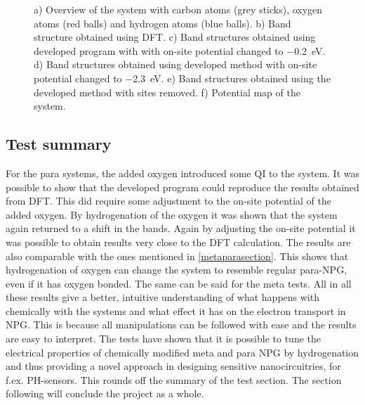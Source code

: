 \begin{figure}[H]
\begin{subfigure}[b]{0.8\textwidth}
		\vspace{-1\baselineskip}
		\caption{}
		\label{potmapMS2OH}
	\end{subfigure}
	\caption{a) Overview of the system with carbon atoms (grey sticks), oxygen atoms (red balls) and hydrogen atoms (blue balls). b) Band structure obtained using DFT. c) Band structures obtained using developed program with with on-site potential changed to \SI{-0.2}{\electronvolt}. d) Band structures obtained using developed method with on-site potential changed to \SI{-2.3}{\electronvolt}. e) Band structures obtained using the developed method with sites removed. f) Potential map of the system.}
	\label{MS2OH}
\end{figure}
\subsection{Test summary}
For the para systems, the added oxygen introduced some QI to the system. It was possible to show that the developed program could reproduce the results obtained from DFT. This did require some adjustment to the on-site potential of the added oxygen. By hydrogenation of the oxygen it was shown that the system again returned to a shift in the bands. Again by adjusting the on-site potential it was possible to obtain results very close to the DFT calculation. The results are also comparable with the ones mentioned in \cref{metaparasection}. This shows that hydrogenation of oxygen can change the system to resemble regular para-NPG, even if it has oxygen bonded. The same can be said for the meta tests. All in all these results give a better, intuitive understanding of what happens with chemically with the systems and what effect it has on the electron transport in NPG. This is because all manipulations can be followed with ease and the results are easy to interpret. The tests have shown that it is possible to tune the electrical properties of chemically modified meta and para NPG by hydrogenation and thus providing a novel approach in designing sensitive nanocircuitries, for f.ex. PH-sensors. This rounds off the summary of the test section. The section following will conclude the project as a whole. 
